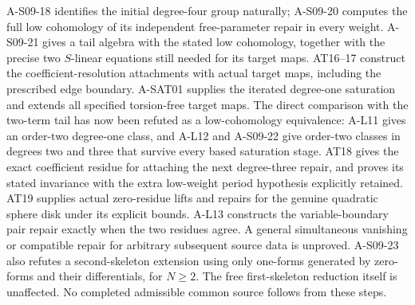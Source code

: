 A-S09-18 identifies the initial degree-four group naturally;
A-S09-20 computes the full low cohomology of its independent
free-parameter repair in every weight.  A-S09-21 gives a tail
algebra with the stated low cohomology, together with the precise
two $S$-linear equations still needed for its target maps.
AT16--17 construct the coefficient-resolution attachments with
actual target maps, including the prescribed edge boundary.
A-SAT01 supplies the iterated degree-one saturation and extends
all specified torsion-free target maps.  The direct comparison
with the two-term tail has now been refuted as a low-cohomology
equivalence: A-L11 gives an order-two degree-one class, and A-L12
and A-S09-22 give order-two classes in degrees two and three that
survive every based saturation stage.  AT18 gives the exact
coefficient residue for attaching the next degree-three repair,
and proves its stated invariance with the extra low-weight
period hypothesis explicitly retained.  AT19 supplies actual zero-residue lifts and repairs for the
genuine quadratic sphere disk under its explicit bounds.
A-L13 constructs the variable-boundary pair repair exactly when
the two residues agree.  A general simultaneous vanishing or
compatible repair for arbitrary subsequent source data is unproved.
A-S09-23 also refutes a second-skeleton extension using only
one-forms generated by zero-forms and their differentials, for
$N\geq2$.  The free first-skeleton reduction itself is unaffected.
No completed admissible common source follows from these steps.

